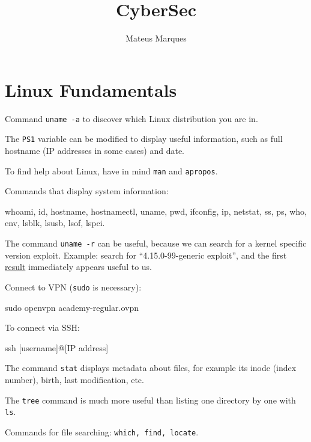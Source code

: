 \documentclass[a4paper,12pt]{article}
\title{\Huge{\textbf{CyberSec}}}
\author{Mateus Marques}
\newcommand{\bashinline}[1]{\texttt{#1}}
\begin{document}
\maketitle

\section{Linux Fundamentals}

Command \bashinline{uname -a} to discover which Linux distribution you are in.

\n

The \bashinline{PS1} variable can be modified to display useful information, such as full hostname (IP addresses in some cases) and date.

\n

To find help about Linux, have in mind \bashinline{man} and \bashinline{apropos}.

\n

Commands that display system information:
\begin{bash}
whoami, id, hostname, hostnamectl, uname, pwd, ifconfig, ip, netstat,
ss, ps, who, env, lsblk, lsusb, lsof, lspci.
\end{bash}

The command \bashinline{uname -r} can be useful, because we can search for a kernel specific version exploit. Example: search for ``4.15.0-99-generic exploit'', and the first \href{https://www.exploit-db.com/exploits/47163}{result} immediately appears useful to us.

\n

Connect to VPN (\bashinline{sudo} is necessary):
\begin{bash}
sudo openvpn academy-regular.ovpn
\end{bash}

To connect via SSH:
\begin{bash}
ssh [username]@[IP address]
\end{bash}

The command \bashinline{stat} displays metadata about files, for example its inode (index number), birth, last modification, etc.

\n

The \bashinline{tree} command is much more useful than listing one directory by one with \bashinline{ls}.

\n

Commands for file searching: \bashinline{which, find, locate}.

\n
\end{document}
